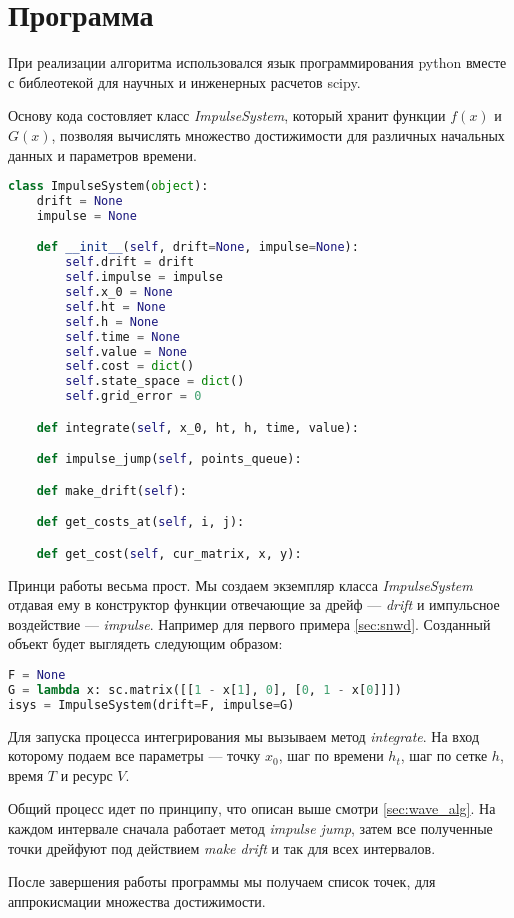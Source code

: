 \section{Программа}
\label{sec:program}

При реализации алгоритма использовался язык программирования python
вместе с библеотекой для научных и инженерных расчетов scipy.

Основу кода состовляет класс \emph{ImpulseSystem}, который хранит
функции $f(x)$ и $G(x)$, позволяя вычислять множество достижимости для
различных начальных данных и параметров времени. 

\begin{lstlisting}[language=Python,
caption={Интерфейс Impulse System}]
class ImpulseSystem(object):
    drift = None
    impulse = None

    def __init__(self, drift=None, impulse=None):
        self.drift = drift
        self.impulse = impulse
        self.x_0 = None
        self.ht = None
        self.h = None
        self.time = None
        self.value = None
        self.cost = dict()
        self.state_space = dict()
        self.grid_error = 0

    def integrate(self, x_0, ht, h, time, value):

    def impulse_jump(self, points_queue):

    def make_drift(self):

    def get_costs_at(self, i, j):

    def get_cost(self, cur_matrix, x, y):
\end{lstlisting}

Принци работы весьма прост. Мы создаем экземпляр класса
\emph{ImpulseSystem} отдавая ему в конструктор функции отвечающие за
дрейф --- \emph{drift} и импульсное воздействие ---
\emph{impulse}. Например для первого примера \ref{sec:snwd}. Созданный объект будет
выглядеть следующим образом:

\begin{lstlisting}[language=Python,
caption={Интерфейс Impulse System}]
F = None
G = lambda x: sc.matrix([[1 - x[1], 0], [0, 1 - x[0]]])
isys = ImpulseSystem(drift=F, impulse=G)
\end{lstlisting}

Для запуска процесса интегрирования мы вызываем метод
\emph{integrate}. На вход которому подаем все параметры --- точку
$x_0$, шаг по времени $h_t$, шаг по сетке $h$, время $T$ и ресурс $V$.

Общий процесс идет по принципу, что описан выше смотри
\ref{sec:wave_alg}. На каждом интервале сначала работает метод
\emph{impulse jump}, затем все полученные точки дрейфуют под действием
\emph{make drift} и так для всех интервалов.

После завершения работы программы мы получаем список точек, для
аппрокисмации множества достижимости.



